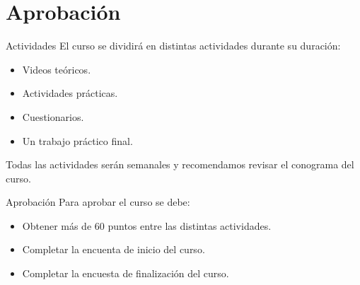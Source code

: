 \documentclass[]{beamer}
\begin{document}
\section{Aprobación}
\begin{frame}{Actividades}
    El curso se dividirá en distintas actividades durante su duración:
    \begin{itemize}[<+->]
        \item Videos teóricos.
        \item Actividades prácticas.
        \item Cuestionarios.
        \item Un trabajo práctico final.
    \end{itemize}
    \pause Todas las actividades serán semanales y recomendamos revisar el conograma del curso.
\end{frame}

\begin{frame}{Aprobación}
    Para aprobar el curso se debe:
    \begin{itemize}[<+->]
        \item Obtener más de 60 puntos entre las distintas actividades.
        \item Completar la encuenta de inicio del curso.
        \item Completar la encuesta de finalización del curso.
    \end{itemize}
\end{frame}
\end{document}
